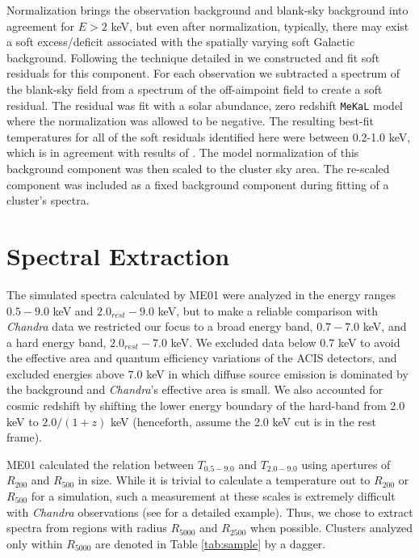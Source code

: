 \documentclass{emulateapj}
\begin{document}
Normalization brings the observation background and blank-sky
background into agreement for $E > 2$ keV, but even after
normalization, typically, there may exist a soft excess/deficit
associated with the spatially varying soft Galactic
background. Following the technique detailed in
\cite{2005ApJ...628..655V} we constructed and fit soft residuals for
this component. For each observation we subtracted a spectrum of the
blank-sky field from a spectrum of the off-aimpoint field to create a
soft residual. The residual was fit with a solar abundance, zero
redshift {\tt MeKaL} model \citep{1985A&AS...62..197M,
1986A&AS...65..511M, 1992SRON, 1995ApJ...438L.115L} where the
normalization was allowed to be negative. The resulting best-fit
temperatures for all of the soft residuals identified here were
between 0.2-1.0 keV, which is in agreement with results of
\cite{2005ApJ...628..655V}. The model normalization of this background
component was then scaled to the cluster sky area. The re-scaled
component was included as a fixed background component during fitting
of a cluster's spectra.

\section{Spectral Extraction} \label{sec:extraction}

The simulated spectra calculated by ME01 were analyzed in the energy
ranges $0.5-9.0$ keV and $2.0_{rest}-9.0$ keV, but to make a reliable
comparison with {\it Chandra} data we restricted our focus to a
broad energy band, $0.7-7.0$ keV, and a hard energy band,
$2.0_{rest}-7.0$ keV. We excluded data below $0.7$ keV to avoid the
effective area and quantum efficiency variations of the ACIS
detectors, and excluded energies above $7.0$ keV in which diffuse source
emission is dominated by the background and {\it Chandra}'s
effective area is small. We also accounted for cosmic redshift by
shifting the lower energy boundary of the hard-band from 2.0 keV to
$2.0/(1+z)$ keV (henceforth, assume the 2.0 keV cut is in the rest
frame).

ME01 calculated the relation between $T_{0.5-9.0}$ and $T_{2.0-9.0}$
using apertures of $R_{200}$ and $R_{500}$ in size. While it is
trivial to calculate a temperature out to $R_{200}$ or $R_{500}$ for
a simulation, such a measurement at these scales is extremely
difficult with {\it Chandra} observations (see \cite{2005ApJ...628..655V} for
a detailed example). Thus, we chose to extract spectra from regions
with radius $R_{5000}$ and $R_{2500}$ when possible. Clusters analyzed
only within $R_{5000}$ are denoted in Table \ref{tab:sample} by a
dagger.
\end{document}
